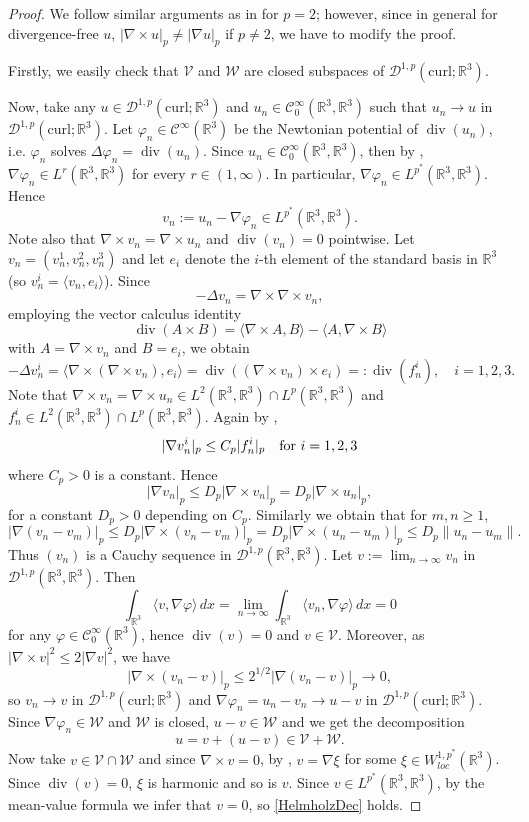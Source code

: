 \documentclass[10pt,a4paper]{amsart}
\newcommand{\vp}{\varphi}
\def\div{\mathop{\mathrm{div}}}
\def\R{\mathbb{R}}
\def\curl{\mathrm{curl}}
\def\V{\mathcal{V}}
\def\Wc{\mathscr{W}}
\def\W{\mathcal{W}}
\newcommand{\cC}{{\mathcal C}}
\newcommand{\cD}{{\mathcal D}}
\newcommand{\cDp}{\cD^{1,p}(\R^3,\R^3)}
\newcommand{\cV}{{\mathcal V}}
\newcommand{\cW}{{\mathcal W}}
\def\r{\mathbb{R}}
\def\r3{\mathbb{R}^3}
\def\Wc{\cD^{1,p}(\curl;\R^3)}
\def\vp{\varphi}
\def\curlop{\nabla\times}
\numberwithin{equation}{section}
\begin{document}
\setcounter{section}{2}
\setcounter{equation}{1}
\setcounter{Th}{1}
\begin{proof} 
We follow similar arguments as in \cite[Lemma 2.4]{MSchSz} for $p=2$; however, since in general for divergence-free $u$, $|\curlop u|_p\neq |\nabla u|_p$ if $p\neq 2$, we have to modify the proof.
 
 Firstly, we easily check that $\V$ and $\cW$ are closed subspaces of $\Wc$.
	 
Now, take any $u\in \Wc$ and $u_n\in\cC_0^{\infty}(\R^3,\R^3)$ such that $u_n\to u$ in $\Wc$. Let $\vp_n\in\cC^{\infty}(\R^3)$ be the Newtonian potential of $\div(u_n)$, i.e. $\vp_n$ solves $\Delta \vp_n = \div(u_n)$.  Since $u_n\in\cC_0^{\infty}(\R^3,\R^3)$, then by \cite[Proposition 1]{Iwaniec}, $\nabla \vp_n\in L^r(\R^3,\R^3)$ for every $r\in(1,\infty)$. In particular, $\nabla\vp_n\in L^{p^*}(\R^3,\R^3)$. 
Hence
$$	v_n:=u_n-\nabla \vp_n\in  L^{p^*}(\R^3,\R^3).
	$$ 
	Note also that  $\curlop v_n = \curlop u_n$  and $\div(v_n)=0$ pointwise. Let $v_n=(v_n^1,v_n^2,v_n^3)$ and let $e_i$ denote the $i$-th element of the standard basis in $\r3$ (so $v_n^i = \langle v_n,e_i\rangle$). Since
$$-\Delta  v_n=\curlop \curlop v_n,$$
employing the vector calculus identity
\[
\div(A\times B) = \langle \curlop A, B\rangle - \langle A,\curlop B\rangle
\] 
with $A = \curlop v_n$ and $B=e_i$, we obtain
\[
-\Delta v_n^i = \langle \curlop(\curlop v_n), e_i\rangle = \div((\curlop v_n)\times e_i) =: \div(f_n^i), \quad i=1,2,3. 
\]
Note that $\curlop v_n = \curlop u_n\in L^2(\R^3,\R^3)\cap L^p(\R^3,\R^3)$ and
$f_n^i\in L^2(\R^3,\R^3)\cap L^p(\R^3,\R^3)$. Again  by \cite[Proposition 1]{Iwaniec}, 
	$$|\nabla v_n^i|_p\leq C_p|f_n^i|_p \quad\hbox{for }i=1,2,3$$
where $C_p>0$ is a constant.
Hence 
\begin{equation}\label{eqes3C}
|\nabla v_n|_p\leq D_p |\curlop v_n|_p = D_p |\curlop u_n|_p,
\end{equation}
for a constant $D_p>0$ depending on $C_p$.
Similarly we obtain that for $m,n\ge 1$,
	$$|\nabla(v_n-v_m)|_{p}\leq D_p|\curlop(v_n-v_m)|_{p}=D_p|\curlop(u_n-u_m)|_{p}\leq D_p \|u_n-u_m\|.$$
	Thus $(v_n)$ is a Cauchy sequence in $\cDp$. Let $v:=\lim_{n\to\infty}v_n$ in $\cDp$. Then
	$$\int_{\R^3}\langle v,\nabla \vp\rangle\,dx=\lim_{n\to\infty}\int_{\R^3}\langle v_n,\nabla \vp\rangle\,dx=0$$
	for any $\vp\in\cC_0^{\infty}(\R^3)$, hence $\div(v) =0$ and $v\in\cV$.
	Moreover, as $|\curlop v|^2 \le 2|\nabla v|^2$, we have 
	\begin{equation} \label{ineq5}
	|\curlop(v_n-v)|_{p}\leq 2^{1/2}|\nabla(v_n-v)|_{p}\to 0,
	\end{equation}
	so $v_n\to v$ in  $\Wc$ and
	$\nabla \vp_n=u_n-v_n\to u-v$ in $\Wc$. Since $\nabla\vp_n\in\cW$ and $\cW$ is closed,
	$u-v\in \cW$ and we get the decomposition
	$$u=v+(u-v)\in \cV+\cW.$$
	\indent Now take $v\in \cV\cap\W$ and since $\curlop v =0$,
	 by \cite[Lemma 1.1(i)]{Le}, $v=\nabla\xi$ for some $\xi\in W^{1,{p^*}}_{loc}(\R^3)$. Since $\div(v) = 0$, $\xi$ is harmonic and so is $v$. Since $v\in L^{p^*}(\R^3,\R^3)$, by the mean-value formula we infer that $v=0$, so \eqref{HelmholzDec} holds.


\end{proof}
\end{document}
